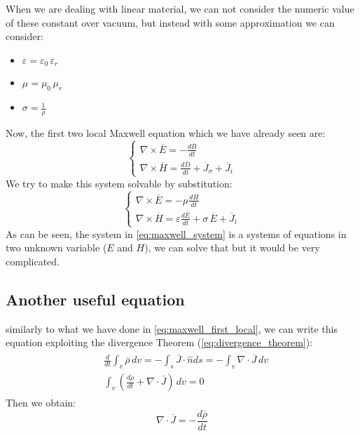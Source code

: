 When we are dealing with linear material, we can not consider the numeric value of these constant over vacuum, but instead with some approximation we can consider:
\begin{itemize}
    \item $\varepsilon=\varepsilon_0\,\varepsilon_r$
    \item $\mu=\mu_0\,\mu_r$
    \item $\sigma=\frac{1}{\rho}$
\end{itemize}
Now, the first two local Maxwell equation which we have already seen are:
\begin{equation}\label{eq:maxwell_system_2}
    \begin{cases}
    \nabla\times\overline{E}=-\frac{d\overline{B}}{dt}\\[5pt]
    \nabla\times\overline{H}=\frac{d\overline{D}}{dt}+\overline{J}_\sigma +\overline{J}_i
    \end{cases}
\end{equation}
We try to make this system solvable by substitution:
\begin{equation}\label{eq:maxwell_system}
    \begin{cases}
    \nabla\times\overline{E}=-\mu\frac{d\overline{H}}{dt}\\[5pt]
    \nabla\times\overline{H}=\varepsilon\frac{d\overline{E}}{dt}+\sigma\,\overline{E}+\overline{J}_i
    \end{cases}
\end{equation}
As can be seen, the system in \cref{eq:maxwell_system} is a systems of equations in two unknown variable ($E$ and $H$), we can solve that but it would be very complicated.
\subsection*{Another useful equation}
similarly to what we have done in \cref{eq:maxwell_first_local}, we can write this equation exploiting the divergence Theorem (\cref{eq:divergence_theorem}):
    \begin{align}
    \begin{split}
    &\frac{d}{dt}\int_v\overline{\rho}\,dv=-\int_s \overline{J}\cdot \hat{n}ds=-\int_v\nabla\cdot\overline{J}\,dv\\[5pt]
    &\int_v\left(\frac{d\overline{\rho}}{dt}+\nabla\cdot\overline{J}\right)\,dv=0
    \end{split}
    \end{align}
Then we obtain:
\begin{equation}
    \nabla\cdot\overline{J}=-\frac{d\overline{\rho}}{dt}
\end{equation}
